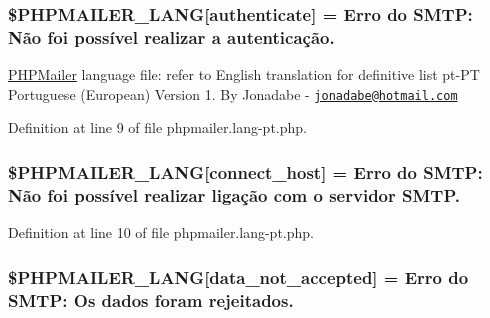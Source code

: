 \subsubsection[{\texorpdfstring{\$\+P\+H\+P\+M\+A\+I\+L\+E\+R\+\_\+\+L\+A\+NG}{$PHPMAILER_LANG}}]{\setlength{\rightskip}{0pt plus 5cm}\$P\+H\+P\+M\+A\+I\+L\+E\+R\+\_\+\+L\+A\+NG\mbox{[}\textquotesingle{}authenticate\textquotesingle{}\mbox{]} = \textquotesingle{}Erro do S\+M\+T\+P\+: Não foi possível realizar {\bf a} autenticação.\textquotesingle{}}\hypertarget{phpmailer_8lang-pt_8php_a2cb33073c989b85580748e331ed8b4aa}{}\label{phpmailer_8lang-pt_8php_a2cb33073c989b85580748e331ed8b4aa}
\hyperlink{class_p_h_p_mailer}{P\+H\+P\+Mailer} language file\+: refer to English translation for definitive list pt-\/\+PT Portuguese (European) Version 1. By Jonadabe -\/ \href{mailto:jonadabe@hotmail.com}{\tt jonadabe@hotmail.\+com} 

Definition at line 9 of file phpmailer.\+lang-\/pt.\+php.

\subsubsection[{\texorpdfstring{\$\+P\+H\+P\+M\+A\+I\+L\+E\+R\+\_\+\+L\+A\+NG}{$PHPMAILER_LANG}}]{\setlength{\rightskip}{0pt plus 5cm}\$P\+H\+P\+M\+A\+I\+L\+E\+R\+\_\+\+L\+A\+NG\mbox{[}\textquotesingle{}connect\+\_\+host\textquotesingle{}\mbox{]} = \textquotesingle{}Erro do S\+M\+T\+P\+: Não foi possível realizar ligação com {\bf o} servidor S\+M\+T\+P.\textquotesingle{}}\hypertarget{phpmailer_8lang-pt_8php_a2ee0cc637a06b96e45600db31c6799ee}{}\label{phpmailer_8lang-pt_8php_a2ee0cc637a06b96e45600db31c6799ee}


Definition at line 10 of file phpmailer.\+lang-\/pt.\+php.

\subsubsection[{\texorpdfstring{\$\+P\+H\+P\+M\+A\+I\+L\+E\+R\+\_\+\+L\+A\+NG}{$PHPMAILER_LANG}}]{\setlength{\rightskip}{0pt plus 5cm}\$P\+H\+P\+M\+A\+I\+L\+E\+R\+\_\+\+L\+A\+NG\mbox{[}\textquotesingle{}data\+\_\+not\+\_\+accepted\textquotesingle{}\mbox{]} = \textquotesingle{}Erro do S\+M\+T\+P\+: Os dados foram rejeitados.\textquotesingle{}}\hypertarget{phpmailer_8lang-pt_8php_a814c6b191205d2361b3233e9c9d6fda5}{}\label{phpmailer_8lang-pt_8php_a814c6b191205d2361b3233e9c9d6fda5}


